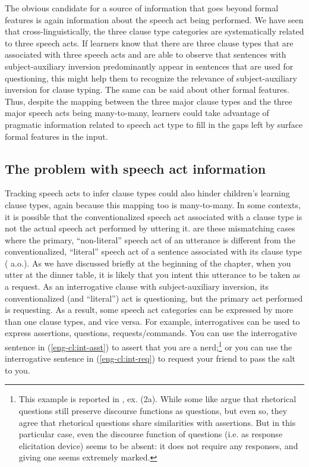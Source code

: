 The obvious candidate for a source of information that goes beyond formal features is again information about the speech act being performed. We have seen that cross-linguistically, the three clause type categories are systematically related to three speech acts. If learners know that there are three clause types that are associated with three speech acts and are able to observe that sentences with subject-auxiliary inversion predominantly appear in sentences that are used for questioning, this might help them to recognize the relevance of subject-auxiliary inversion for clause typing. The same can be said about other formal features. Thus, despite the mapping between the three major clause types and the three major speech acts being many-to-many, learners could take advantage of pragmatic information related to speech act type to fill in the gaps left by surface formal features in the input. 

\subsection{The problem with speech act information}
Tracking speech acts to infer clause types could also hinder children's learning clause types, again because this mapping too is many-to-many. In some contexts, it is possible that the conventionalized speech act associated with a clause type is not the actual speech act performed by uttering it.  are these mismatching cases where the primary, ``non-literal'' speech act of an utterance is different from the conventionalized, ``literal'' speech act of a sentence associated with its clause type (\citealt{searle1975tax, searle1976class, bachharnish1979, searlevanderveken1985, portner2004, starr2014, portner2018, murraystarr2020} a.o.). As we have discussed briefly at the beginning of the chapter,  when you utter  at the dinner table, it is likely that you intent this utterance to be taken as a request. As an interrogative clause with subject-auxiliary inversion, its conventionalized (and ``literal'') act is questioning, but the primary act performed is requesting. As a result, some speech act categories can be expressed by more than one clause types, and vice versa. For example, interrogatives can be used to express assertions, questions, requests/commands. You can use the interrogative sentence in (\ref{eng-cl:int-asst}) to assert that you are a nerd;\footnote{This example is reported in \cite{biezma2017rhetorical}, ex. (2a). While some like \textcite{biezma2017rhetorical} argue that rhetorical questions still preserve discourse functions as questions, but even so, they agree that rhetorical questions share similarities with assertions. But in this particular case, even the discourse function of questions (i.e. as response elicitation device) seems to be absent: it does not require any responses, and giving one seems extremely marked. } or you can use the interrogative sentence in (\ref{eng-cl:int-req}) to request your friend to pass the salt to you.

